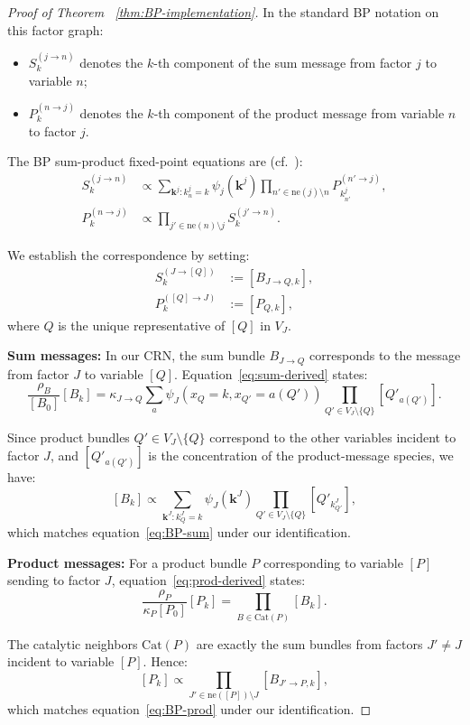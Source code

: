 \documentclass{article}
\theoremstyle{plain}
\theoremstyle{definition}
\theoremstyle{remark}
\newcommand{\Cat}{\textrm{Cat}}
\newcommand{\<}{\langle}
\renewcommand{\>}{\rangle}
\begin{document}
\begin{proof}[Proof of Theorem ~\ref{thm:BP-implementation}]
In the standard BP notation on this factor graph:
\begin{itemize}
\item $S^{(j \to n)}_k$ denotes the $k$-th component of the sum message from factor $j$ 
to variable $n$;
\item $P^{(n \to j)}_k$ denotes the $k$-th component of the product message from variable 
$n$ to factor $j$.
\end{itemize}

The BP sum-product fixed-point equations are (cf.~\cite{NIPS2013_e5e63da7}):
\begin{align}
S^{(j \to n)}_k &\propto \sum_{\mathbf{k}^j : k^j_n = k} \psi_j(\mathbf{k}^j) 
\prod_{n' \in \mathrm{ne}(j) \setminus n} P^{(n' \to j)}_{k^j_{n'}}, \label{eq:BP-sum}\\
P^{(n \to j)}_k &\propto \prod_{j' \in \mathrm{ne}(n) \setminus j} S^{(j' \to n)}_k. \label{eq:BP-prod}
\end{align}

We establish the correspondence by setting:
\begin{align*}
S^{(J \to [Q])}_k &:= [B_{J \to Q, k}], \\
P^{([Q] \to J)}_k &:= [P_{Q, k}],
\end{align*}
where $Q$ is the unique representative of $[Q]$ in $V_J$.

\textbf{Sum messages:} In our CRN, the sum bundle $B_{J \to Q}$ corresponds to the 
message from factor $J$ to variable $[Q]$. Equation~\eqref{eq:sum-derived} states:
\[
\frac{\rho_B}{[B_0]}[B_k] = \kappa_{J \to Q} \sum_{a} \psi_J(x_Q = k, x_{Q'} = a(Q')) 
\prod_{Q' \in V_J\setminus\{Q\}} [Q'_{a(Q')}].
\]

Since product bundles $Q' \in V_J \setminus \{Q\}$ correspond to the other variables 
incident to factor $J$, and $[Q'_{a(Q')}]$ is the concentration of the product-message 
species, we have:
\[
[B_k] \propto \sum_{\mathbf{k}^J : k^J_Q = k} \psi_J(\mathbf{k}^J) \prod_{Q' \in V_J\setminus\{Q\}} [Q'_{k^J_{Q'}}],
\]
which matches equation~\eqref{eq:BP-sum} under our identification.

\textbf{Product messages:} For a product bundle $P$ corresponding to variable $[P]$ 
sending to factor $J$, equation~\eqref{eq:prod-derived} states:
\[
\frac{\rho_P}{\kappa_P [P_0]}[P_k] = \prod_{B \in \Cat(P)} [B_k].
\]

The catalytic neighbors $\Cat(P)$ are exactly the sum bundles from factors 
$J' \neq J$ incident to variable $[P]$. Hence:
\[
[P_k] \propto \prod_{J' \in \mathrm{ne}([P]) \setminus J} [B_{J' \to P, k}],
\]
which matches equation~\eqref{eq:BP-prod} under our identification.


\end{proof}
\end{document}
